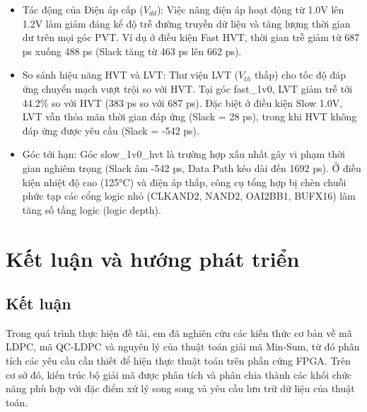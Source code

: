 \documentclass[12pt,a4paper,oneside]{book}
\begin{document}
\begin{itemize}
    \item Tác động của Điện áp cấp ($V_{dd}$): Việc nâng điện áp hoạt động từ 1.0V lên 1.2V làm giảm đáng kể độ trễ đường truyền dữ liệu và tăng lượng thời gian dư trên mọi góc PVT. Ví dụ ở điều kiện Fast HVT, thời gian trễ giảm từ 687 ps xuống 488 ps (Slack tăng từ 463 ps lên 662 ps).
    \item So sánh hiệu năng HVT và LVT: Thư viện LVT ($V_{th}$ thấp) cho tốc độ đáp ứng chuyển mạch vượt trội so với HVT. Tại góc fast\_1v0, LVT giảm trễ tới 44.2\% so với HVT (383 ps so với 687 ps). Đặc biệt ở điều kiện Slow 1.0V, LVT vẫn thỏa mãn thời gian đáp ứng (Slack = 28 ps), trong khi HVT không đáp ứng được yêu cầu (Slack = -542 ps).
    \item Góc tới hạn: Góc slow\_1v0\_hvt là trường hợp xấu nhất gây vi phạm thời gian nghiêm trọng (Slack âm -542 ps, Data Path kéo dài đến 1692 ps). Ở điều kiện nhiệt độ cao (125°C) và điện áp thấp, công cụ tổng hợp bị chèn chuỗi phức tạp các cổng logic nhỏ (CLKAND2, NAND2, OAI2BB1, BUFX16) làm tăng số tầng logic (logic depth).
\end{itemize}





\chapter{Kết luận và hướng phát triển}
\section{Kết luận}
Trong quá trình thực hiện đề tài, em đã nghiên cứu các kiến thức cơ bản về mã LDPC, mã QC-LDPC và nguyên lý của thuật toán giải mã Min-Sum, từ đó phân tích các yêu cầu cần thiết để hiện thực thuật toán trên phần cứng FPGA. Trên cơ sở đó, kiến trúc bộ giải mã được phân tích và phân chia thành các khối chức năng phù hợp với đặc điểm xử lý song song và yêu cầu lưu trữ dữ liệu của thuật toán.
\end{document}
